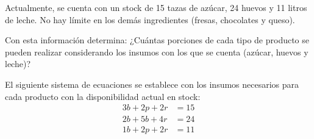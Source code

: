 \documentclass[12pt]{article}
\begin{document}
\begin{enumerate}
    Actualmente, se cuenta con un stock de 15 tazas de azúcar, 24 huevos y 11 litros de leche. No hay límite en los demás ingredientes (fresas, chocolates y queso).

    Con esta información determina: ¿Cuántas porciones de cada tipo de producto se pueden realizar considerando los insumos con los que se cuenta (azúcar, huevos y leche)?

    El siguiente sistema de ecuaciones se establece con los insumos necesarios para cada producto con la disponibilidad actual en stock:
    \begin{align*}
        3b + 2p +2r &= 15 \\
        2b + 5b + 4r &= 24 \\
        1b + 2p +2r &= 11
    \end{align*}
\end{enumerate}



\end{document}

